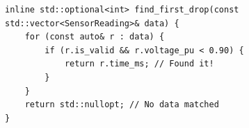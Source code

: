 \begin{verbatim}
inline std::optional<int> find_first_drop(const std::vector<SensorReading>& data) {
    for (const auto& r : data) {
        if (r.is_valid && r.voltage_pu < 0.90) {
            return r.time_ms; // Found it!
        }
    }
    return std::nullopt; // No data matched
}
\end{verbatim}

